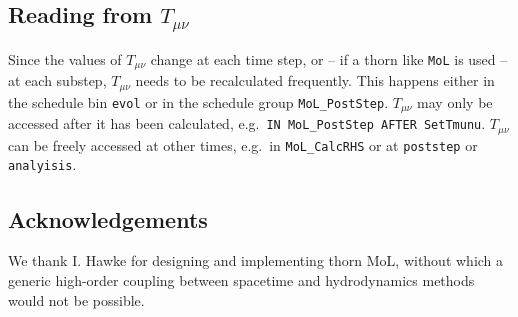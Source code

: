 \documentclass{article}
\begin{document}
\subsection{Reading from $T_{\mu\nu}$}

Since the values of $T_{\mu\nu}$ change at each time step, or -- if a
thorn like \texttt{MoL} is used -- at each substep, $T_{\mu\nu}$ needs
to be recalculated frequently.  This happens either in the schedule
bin \texttt{evol} or in the schedule group \texttt{MoL\_PostStep}.
$T_{\mu\nu}$ may only be accessed after it has been calculated, e.g.\
\texttt{IN MoL\_PostStep AFTER SetTmunu}.  $T_{\mu\nu}$ can be freely
accessed at other times, e.g.\ in \texttt{MoL\_CalcRHS} or at
\texttt{poststep} or \texttt{analyisis}.

\subsection{Acknowledgements}

We thank I. Hawke for designing and implementing thorn MoL, without
which a generic high-order coupling between spacetime and
hydrodynamics methods would not be possible.

\end{document}
